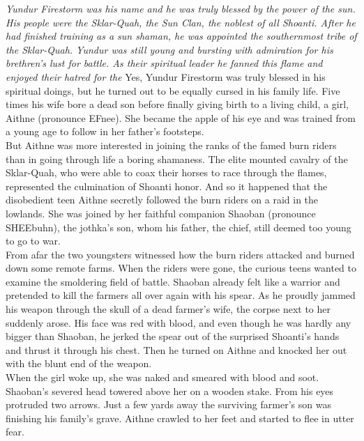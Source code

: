  {\itshape Yundur Firestorm was his name and he was truly blessed by the power of the sun. His people were the Sklar-Quah, the Sun Clan, the noblest of all Shoanti. After he had finished training as a sun shaman, he was appointed the southernmost tribe of the Sklar-Quah. Yundur was still young and bursting with admiration for his brethren's lust for battle. As their spiritual leader he fanned this flame and enjoyed their hatred for the}  Yes, Yundur Firestorm was truly blessed in his spiritual doings, but he turned out to be equally cursed in his family life. Five times his wife bore a dead son before finally giving birth to a living child, a girl, Aithne (pronounce EFnee). She became the apple of his eye and was trained from a young age to follow in her father's footsteps.\\

But Aithne was more interested in joining the ranks of the famed burn riders than in going through life a boring shamaness. The elite mounted cavalry of the Sklar-Quah, who were able to coax their horses to race through the flames, represented the culmination of Shoanti honor. And so it happened that the disobedient teen Aithne secretly followed the burn riders on a raid in the lowlands. She was joined by her faithful companion Shaoban (pronounce SHEEbuhn), the jothka's son, whom his father, the chief, still deemed too young to go to war.\\

From afar the two youngsters witnessed how the burn riders attacked and burned down some remote farms. When the riders were gone, the curious teens wanted to examine the smoldering field of battle. Shaoban already felt like a warrior and pretended to kill the farmers all over again with his spear. As he proudly jammed his weapon through the skull of a dead farmer's wife, the corpse next to her suddenly arose. His face was red with blood, and even though he was hardly any bigger than Shaoban, he jerked the spear out of the surprised Shoanti's hands and thrust it through his chest. Then he turned on Aithne and knocked her out with the blunt end of the weapon.\\

When the girl woke up, she was naked and smeared with blood and soot. Shaoban's severed head towered above her on a wooden stake. From his eyes protruded two arrows. Just a few yards away the surviving farmer's son was finishing his family's grave. Aithne crawled to her feet and started to flee in utter fear.\\

